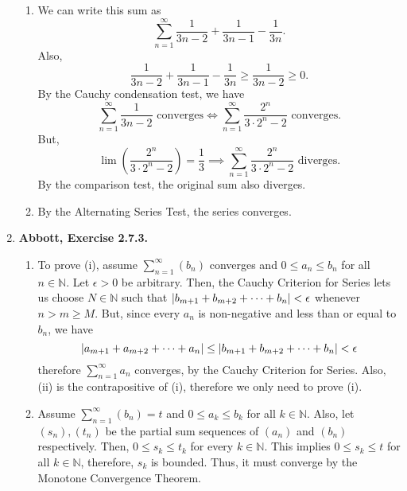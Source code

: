 \documentclass{article}
\DeclarePairedDelimiter\abs{\lvert}{\rvert}
\newcommand{\N}{\mathbb{N}}
\newcommand{\exc}[2][Abbott]{\item \textbf{#1, Exercise #2.}}
\newcommand{\lep}[1][L]{#1et $\epsilon > 0$ be arbitrary}
\begin{document}
\begin{enumerate}
\begin{enumerate}
        \item We can write this sum as 
        \begin{equation*}
            \sum_{n=1}^\infty \frac{1}{3n-2}+\frac{1}{3n-1}-\frac{1}{3n}.
        \end{equation*} Also, 
        \begin{equation*}
             \frac{1}{3n-2}+\frac{1}{3n-1}-\frac{1}{3n} \geq \frac{1}{3n-2} \geq 0.
        \end{equation*} By the Cauchy condensation test, we have
        \begin{equation*}
            \sum_{n=1}^\infty \frac{1}{3n-2} \text{ converges} \iff 
            \sum_{n=1}^\infty \frac{2^n}{3\cdot2^n-2} \text{ converges.}
        \end{equation*} But, 
        \begin{equation*}
            \lim\left({\frac{2^n}{3\cdot2^n-2}}\right) = \frac{1}{3} \implies 
            \sum_{n=1}^\infty \frac{2^n}{3\cdot2^n-2} \text{ diverges.}
        \end{equation*} By the comparison test, the original sum also diverges.
        
        \item By the Alternating Series Test, the series converges.
    \end{enumerate}
    
    \exc{2.7.3}
    \begin{enumerate}
        \item To prove (i), assume $\sum_{n=1}^\infty (b_n)$ converges and $0 \leq a_n \leq b_n$ for all $n \in \N$. \lep. Then, the Cauchy Criterion for Series lets us choose $N \in \N$ such that $\abs{b_{m+1}+b_{m+2} + \dots + b_{n}} < \epsilon$ whenever $n > m \geq M$. But, since every $a_n$ is non-negative and less than or equal to $b_n$, we have 
        \begin{equation*}
           \abs{a_{m+1}+a_{m+2} + \dots + a_{n}} \leq \abs{b_{m+1}+b_{m+2} + \dots + b_{n}} < \epsilon
        \end{equation*} therefore $\sum_{n=1}^\infty a_n$ converges, by the Cauchy Criterion for Series. Also, (ii) is the contrapositive of (i), therefore we only need to prove (i).
        
        \item Assume $\sum_{n=1}^\infty (b_n) = t$ and $0 \leq a_k \leq b_k$ for all $k \in \N$. Also, let $(s_n), (t_n)$ be the partial sum sequences of $(a_n)$ and $(b_n)$ respectively. Then, $0 \leq s_k \leq t_k$ for every $k \in \N$. This implies $0 \leq s_k \leq t$ for all $k \in \N$, therefore, $s_k$ is bounded. Thus, it must converge by the Monotone Convergence Theorem.
    \end{enumerate}
    

\end{enumerate}
\end{document}
